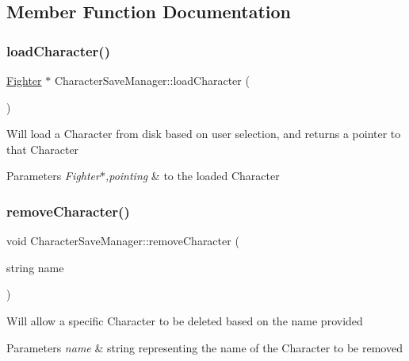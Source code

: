 \subsection{Member Function Documentation}
\hypertarget{class_character_save_manager_a44105e8553b29cd7e37f3eec6f1a7ce7}{}\label{class_character_save_manager_a44105e8553b29cd7e37f3eec6f1a7ce7} 
\subsubsection{\texorpdfstring{load\+Character()}{loadCharacter()}}
{\footnotesize\ttfamily \hyperlink{class_fighter}{Fighter} $\ast$ Character\+Save\+Manager\+::load\+Character (\begin{DoxyParamCaption}{ }\end{DoxyParamCaption})\hspace{0.3cm}{\ttfamily [static]}}

Will load a Character from disk based on user selection, and returns a pointer to that Character 
\begin{DoxyParams}{Parameters}
{\em Fighter$\ast$,pointing} & to the loaded Character \\
\hline
\end{DoxyParams}
\hypertarget{class_character_save_manager_a49dd1eedbdf0e2b7cedfba64d4fb8d53}{}\label{class_character_save_manager_a49dd1eedbdf0e2b7cedfba64d4fb8d53} 
\subsubsection{\texorpdfstring{remove\+Character()}{removeCharacter()}}
{\footnotesize\ttfamily void Character\+Save\+Manager\+::remove\+Character (\begin{DoxyParamCaption}\item[{string}]{name }\end{DoxyParamCaption})\hspace{0.3cm}{\ttfamily [static]}}

Will allow a specific Character to be deleted based on the name provided 
\begin{DoxyParams}{Parameters}
{\em name} & string representing the name of the Character to be removed \\
\hline
\end{DoxyParams}
\hypertarget{class_character_save_manager_a7e4ce04eed479a22b1d3f70c9fe06652}{}\label{class_character_save_manager_a7e4ce04eed479a22b1d3f70c9fe06652} 
